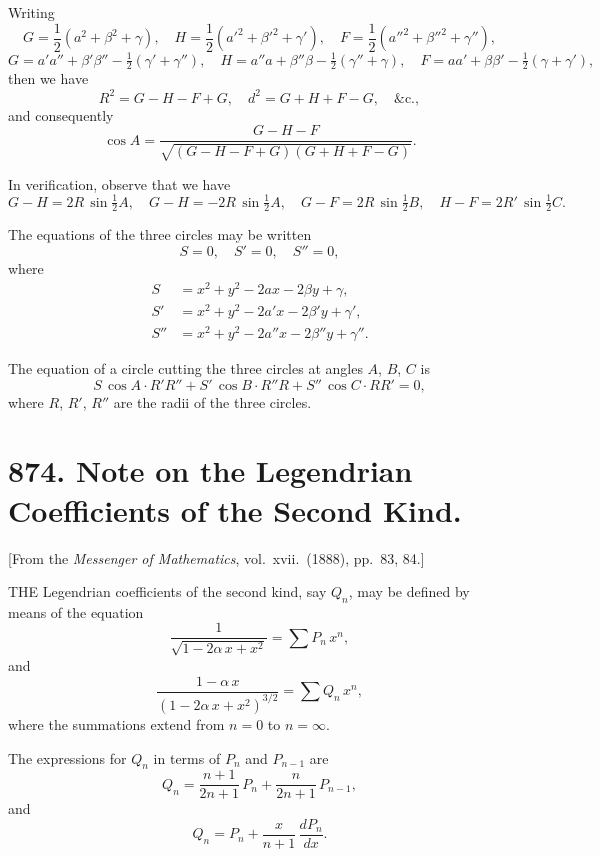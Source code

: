 \documentclass[11pt,a4paper]{book}
\begin{document}
Writing
\[
G = \frac{1}{2}(a^{2} + \beta^{2} + \gamma), \quad H = \frac{1}{2}(a'^{2} + \beta'^{2} + \gamma'), \quad F = \frac{1}{2}(a''^{2} + \beta''^{2} + \gamma''),
\]
\[
G = a' a'' + \beta' \beta'' - \tfrac{1}{2}(\gamma' + \gamma''), \quad
H = a'' a + \beta'' \beta - \tfrac{1}{2}(\gamma'' + \gamma), \quad
F = a a' + \beta \beta' - \tfrac{1}{2}(\gamma + \gamma'),
\]
then we have
\[
R^{2} = G - H - F + G, \quad d^{2} = G + H + F - G, \quad \&\text{c.},
\]
and consequently
\[
\cos A = \frac{G - H - F}{\sqrt{(G - H - F + G)(G + H + F - G)}}.
\]

\medskip\noindent
In verification, observe that we have
\[
G - H = 2R\,\sin\tfrac{1}{2}A, \quad G - H = -2R\,\sin\tfrac{1}{2}A, \quad G - F = 2R\,\sin\tfrac{1}{2}B, \quad H - F = 2R'\,\sin\tfrac{1}{2}C.
\]

\medskip\noindent
The equations of the three circles may be written
\[
S = 0, \quad S' = 0, \quad S'' = 0,
\]
where
\begin{align*}
S &= x^{2} + y^{2} - 2ax - 2\beta y + \gamma, \\
S' &= x^{2} + y^{2} - 2a'x - 2\beta' y + \gamma', \\
S'' &= x^{2} + y^{2} - 2a''x - 2\beta'' y + \gamma''.
\end{align*}

The equation of a circle cutting the three circles at angles $A$, $B$, $C$ is
\[
S\,\cos A \cdot R'R'' + S'\,\cos B \cdot R''R + S''\,\cos C \cdot RR' = 0,
\]
where $R$, $R'$, $R''$ are the radii of the three circles.

\newpage
\section[874]{874. Note on the Legendrian Coefficients of the Second Kind.}
\label{sec:874}

[From the \textit{Messenger of Mathematics}, vol.\ xvii.\ (1888), pp.\ 83, 84.]

\medskip\noindent
THE Legendrian coefficients of the second kind, say $Q_{n}$, may be defined by means of the equation
\[
\frac{1}{\sqrt{1 - 2\alpha\,x + x^{2}}} = \sum P_{n}\,x^{n},
\]
and
\[
\frac{1 - \alpha\,x}{(1 - 2\alpha\,x + x^{2})^{3/2}} = \sum Q_{n}\,x^{n},
\]
where the summations extend from $n = 0$ to $n = \infty$.

The expressions for $Q_{n}$ in terms of $P_{n}$ and $P_{n-1}$ are
\[
Q_{n} = \frac{n+1}{2n+1}\,P_{n} + \frac{n}{2n+1}\,P_{n-1},
\]
and
\[
Q_{n} = P_{n} + \frac{x}{n+1}\,\frac{dP_{n}}{dx}.
\]
\end{document}

